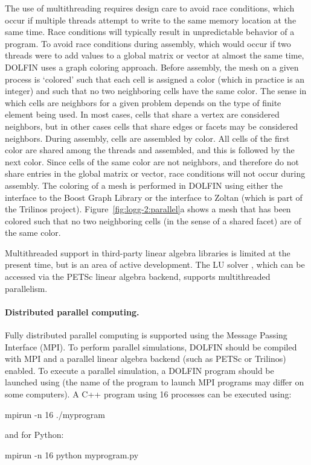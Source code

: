 The use of multithreading requires design care to avoid race conditions,
which occur if multiple threads attempt to write to the same memory
location at the same time.  Race conditions will typically result in
unpredictable behavior of a program. To avoid race conditions during
assembly, which would occur if two threads were to add values to a global
matrix or vector at almost the same time, DOLFIN uses a graph coloring
approach.  Before assembly, the mesh on a given process is `colored'
such that each cell is assigned a color (which in practice is an integer)
and such that no two neighboring cells have the same color. The sense
in which cells are neighbors for a given problem depends on the type
of finite element being used. In most cases, cells that share a vertex
are considered neighbors, but in other cases cells that share edges or
facets may be considered neighbors. During assembly, cells are assembled
by color. All cells of the first color are shared among the threads
and assembled, and this is followed by the next color. Since cells of
the same color are not neighbors, and therefore do not share entries in the
global matrix or vector, race conditions will not occur during assembly.
The coloring of a mesh is performed in DOLFIN using either the interface
to the Boost Graph Library or the interface to Zoltan (which is part of
the Trilinos project).  Figure~\ref{fig:logg-2:parallel}a shows a mesh
that has been colored such that no two neighboring cells (in the sense
of a shared facet) are of the same color.

Multithreaded support in third-party linear algebra libraries is limited
at the present time, but is an area of active development.  The LU solver
\citet{www:pastix}, which can be accessed via the PETSc linear algebra
backend, supports multithreaded parallelism.

\paragraph{Distributed parallel computing.}

Fully distributed parallel computing is supported using the Message
Passing Interface (MPI). To perform parallel simulations, DOLFIN should
be compiled with MPI and a parallel linear algebra backend (such as PETSc
or Trilinos) enabled. To execute a parallel simulation, a DOLFIN program
should be launched using  (the name of the program to launch MPI
programs may differ on some computers). A C++ program using 16 processes
can be executed using:
\begin{bash}
mpirun -n 16 ./myprogram
\end{bash}
and for Python:
\begin{bash}
mpirun -n 16 python myprogram.py
\end{bash}

